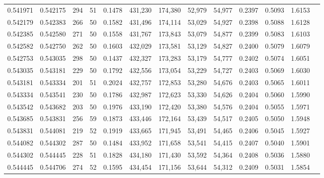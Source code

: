 \begin{tabular}{rrrrrrrrrrrrr}
0.541971 & 0.542175 &   294 &  51 &                                     0.1478 & 431,230 & 174,380 &  52,979 &  54,977 & 0.2397 & 0.5093 & 1.6153 \\
0.542179 & 0.542383 &   266 &  50 &                                     0.1582 & 431,496 & 174,114 &  53,029 &  54,927 & 0.2398 & 0.5088 & 1.6128 \\
0.542385 & 0.542580 &   271 &  50 &                                     0.1558 & 431,767 & 173,843 &  53,079 &  54,877 & 0.2399 & 0.5083 & 1.6103 \\
0.542582 & 0.542750 &   262 &  50 &                                     0.1603 & 432,029 & 173,581 &  53,129 &  54,827 & 0.2400 & 0.5079 & 1.6079 \\
0.542753 & 0.543035 &   298 &  50 &                                     0.1437 & 432,327 & 173,283 &  53,179 &  54,777 & 0.2402 & 0.5074 & 1.6051 \\
0.543035 & 0.543181 &   229 &  50 &                                     0.1792 & 432,556 & 173,054 &  53,229 &  54,727 & 0.2403 & 0.5069 & 1.6030 \\
0.543181 & 0.543334 &   201 &  51 &                                     0.2024 & 432,757 & 172,853 &  53,280 &  54,676 & 0.2403 & 0.5065 & 1.6011 \\
0.543334 & 0.543541 &   230 &  50 &                                     0.1786 & 432,987 & 172,623 &  53,330 &  54,626 & 0.2404 & 0.5060 & 1.5990 \\
0.543542 & 0.543682 &   203 &  50 &                                     0.1976 & 433,190 & 172,420 &  53,380 &  54,576 & 0.2404 & 0.5055 & 1.5971 \\
0.543685 & 0.543831 &   256 &  59 &                                     0.1873 & 433,446 & 172,164 &  53,439 &  54,517 & 0.2405 & 0.5050 & 1.5948 \\
0.543831 & 0.544081 &   219 &  52 &                                     0.1919 & 433,665 & 171,945 &  53,491 &  54,465 & 0.2406 & 0.5045 & 1.5927 \\
0.544082 & 0.544302 &   287 &  50 &                                     0.1484 & 433,952 & 171,658 &  53,541 &  54,415 & 0.2407 & 0.5040 & 1.5901 \\
0.544302 & 0.544445 &   228 &  51 &                                     0.1828 & 434,180 & 171,430 &  53,592 &  54,364 & 0.2408 & 0.5036 & 1.5880 \\
0.544445 & 0.544706 &   274 &  52 &                                     0.1595 & 434,454 & 171,156 &  53,644 &  54,312 & 0.2409 & 0.5031 & 1.5854 \\

\end{tabular}

